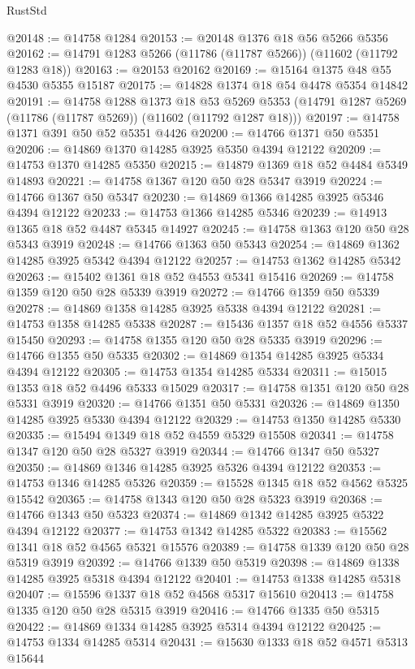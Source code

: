 \begin{lexlean}{RustStd}
\begin{coremodule}
@20148 := @14758 @1284
@20153 := @20148 @1376 @18 @56 @5266 @5356
@20162 := @14791 @1283 @5266 (@11786 (@11787 @5266)) (@11602 (@11792 @1283 @18))
@20163 := @20153 @20162
@20169 := @15164 @1375 @48 @55 @4530 @5355 @15187
@20175 := @14828 @1374 @18 @54 @4478 @5354 @14842
@20191 := @14758
    @1288
    @1373
    @18
    @53
    @5269
    @5353
    (@14791 @1287 @5269 (@11786 (@11787 @5269)) (@11602 (@11792 @1287 @18)))
@20197 := @14758 @1371 @391 @50 @52 @5351 @4426
@20200 := @14766 @1371 @50 @5351
@20206 := @14869 @1370 @14285 @3925 @5350 @4394 @12122
@20209 := @14753 @1370 @14285 @5350
@20215 := @14879 @1369 @18 @52 @4484 @5349 @14893
@20221 := @14758 @1367 @120 @50 @28 @5347 @3919
@20224 := @14766 @1367 @50 @5347
@20230 := @14869 @1366 @14285 @3925 @5346 @4394 @12122
@20233 := @14753 @1366 @14285 @5346
@20239 := @14913 @1365 @18 @52 @4487 @5345 @14927
@20245 := @14758 @1363 @120 @50 @28 @5343 @3919
@20248 := @14766 @1363 @50 @5343
@20254 := @14869 @1362 @14285 @3925 @5342 @4394 @12122
@20257 := @14753 @1362 @14285 @5342
@20263 := @15402 @1361 @18 @52 @4553 @5341 @15416
@20269 := @14758 @1359 @120 @50 @28 @5339 @3919
@20272 := @14766 @1359 @50 @5339
@20278 := @14869 @1358 @14285 @3925 @5338 @4394 @12122
@20281 := @14753 @1358 @14285 @5338
@20287 := @15436 @1357 @18 @52 @4556 @5337 @15450
@20293 := @14758 @1355 @120 @50 @28 @5335 @3919
@20296 := @14766 @1355 @50 @5335
@20302 := @14869 @1354 @14285 @3925 @5334 @4394 @12122
@20305 := @14753 @1354 @14285 @5334
@20311 := @15015 @1353 @18 @52 @4496 @5333 @15029
@20317 := @14758 @1351 @120 @50 @28 @5331 @3919
@20320 := @14766 @1351 @50 @5331
@20326 := @14869 @1350 @14285 @3925 @5330 @4394 @12122
@20329 := @14753 @1350 @14285 @5330
@20335 := @15494 @1349 @18 @52 @4559 @5329 @15508
@20341 := @14758 @1347 @120 @50 @28 @5327 @3919
@20344 := @14766 @1347 @50 @5327
@20350 := @14869 @1346 @14285 @3925 @5326 @4394 @12122
@20353 := @14753 @1346 @14285 @5326
@20359 := @15528 @1345 @18 @52 @4562 @5325 @15542
@20365 := @14758 @1343 @120 @50 @28 @5323 @3919
@20368 := @14766 @1343 @50 @5323
@20374 := @14869 @1342 @14285 @3925 @5322 @4394 @12122
@20377 := @14753 @1342 @14285 @5322
@20383 := @15562 @1341 @18 @52 @4565 @5321 @15576
@20389 := @14758 @1339 @120 @50 @28 @5319 @3919
@20392 := @14766 @1339 @50 @5319
@20398 := @14869 @1338 @14285 @3925 @5318 @4394 @12122
@20401 := @14753 @1338 @14285 @5318
@20407 := @15596 @1337 @18 @52 @4568 @5317 @15610
@20413 := @14758 @1335 @120 @50 @28 @5315 @3919
@20416 := @14766 @1335 @50 @5315
@20422 := @14869 @1334 @14285 @3925 @5314 @4394 @12122
@20425 := @14753 @1334 @14285 @5314
@20431 := @15630 @1333 @18 @52 @4571 @5313 @15644

\end{coremodule}
\end{lexlean}
